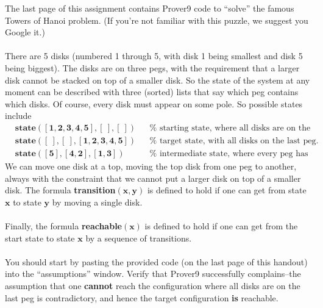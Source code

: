 \documentclass[12pt,letterpaper,boxed,cm]{hmcpset}
\newcommand{\mf}[1]{\mathbf{#1}}
\begin{document}
\begin{problem}[3.]
    [9 points] The last page of this assignment contains Prover9 code to ``solve'' the famous Towers of Hanoi problem. (If you’re not familiar with this puzzle, we suggest you Google it.)\\\\
    There are 5 disks (numbered 1 through 5, with disk 1 being smallest and disk 5 being biggest). The disks are on three pegs, with the requirement that a larger disk cannot be stacked on top of a smaller disk. So the state of the system at any moment can be described with three (sorted) lists that say which peg contains which disks. Of course, every disk must appear on some pole. So possible states include
    \begin{align*}
        &\textbf{state}\mathbf{([1,2,3,4,5], [~], [~])}   &&\% \text{ starting state, where all disks are on the first peg.}\\
        &\textbf{state}\mathbf{([~], [~], [1,2,3,4,5])}   &&\% \text{ target state, with all disks on the last peg.}\\
        &\textbf{state}\mathbf{([5], [4,2], [1,3])}       &&\% \text{ intermediate state, where every peg has some disks.}
    \end{align*}
    We can move one disk at a top, moving the top disk from one peg to another, always with the constraint that we cannot put a larger disk on top of a smaller disk. The formula \textbf{transition}$\mathbf{(x,y)}$ is defined to hold if one can get from state $\mf{x}$ to state $\mf{y}$ by moving a single disk.\\\\
    Finally, the formula \textbf{reachable}$\mathbf{(x)}$ is defined to hold if one can get from the start state to state $\mf{x}$ by a sequence of transitions.\\\\
    You should start by pasting the provided code (on the last page of this handout) into the ``assumptions'' window. Verify that Prover9 successfully complains--the assumption that one \textbf{cannot} reach the configuration where all disks are on the last peg is contradictory, and hence the target configuration \textbf{is} reachable.
\end{problem}
\newpage
\end{document}
